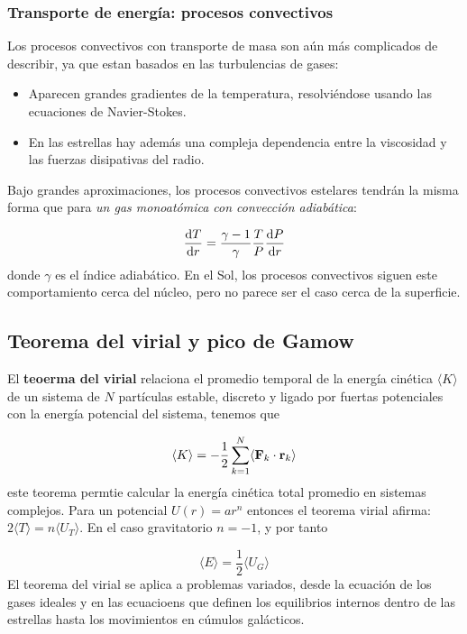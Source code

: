 \subsubsection{Transporte de energía: procesos convectivos}

Los procesos convectivos con transporte de masa son aún más complicados de describir, ya que estan basados en las turbulencias de gases:

\begin{itemize}
	\item Aparecen grandes gradientes de la temperatura, resolviéndose usando las ecuaciones de Navier-Stokes.
	\item En las estrellas hay además una compleja dependencia entre la viscosidad y las fuerzas disipativas del radio.
\end{itemize}
Bajo grandes aproximaciones, los procesos convectivos estelares tendrán la misma forma que para \textit{un gas monoatómica con convección adiabática}:

\begin{equation}
	\frac{\mathrm{d} T}{\mathrm{d} r} = \frac{\gamma-1}{\gamma} \frac{T}{P} \frac{\mathrm{d} P}{\mathrm{d} r}
\end{equation}
donde $\gamma$ es el índice adiabático. En el Sol, los procesos convectivos siguen este comportamiento cerca del núcleo, pero no parece ser el caso cerca de la superficie.

\subsection{Teorema del virial y pico de Gamow}

El \textbf{teoerma del virial} relaciona el promedio temporal de la energía cinética $\langle K \rangle$ de un sistema de $N$ partículas estable, discreto y ligado por fuertas potenciales con la energía potencial del sistema, tenemos que

\begin{equation}
	\langle K \rangle = - \frac{1}{2} \sum_{k=1}^N \langle \mathbf{F}_k  \cdot \mathbf{r}_k\rangle
\end{equation}
este teorema permtie calcular la energía cinética total promedio en sistemas complejos. Para un potencial $U(r)=ar^n$ entonces el teorema virial afirma: $2\langle T \rangle = n\langle U_T\rangle$. En el caso gravitatorio $n=-1$, y por tanto

\begin{equation}
	\langle E \rangle = \frac{1}{2} \langle U_G \rangle
\end{equation}
El teorema del virial se aplica a problemas variados, desde la ecuación de los gases ideales y en las ecuacioens que definen los equilibrios internos dentro de las estrellas hasta los movimientos en cúmulos galácticos.

